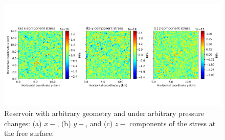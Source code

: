\documentclass[journal abbreviation, manuscript]{copernicus}
\begin{document}
\begin{figure}[ht]
\includegraphics[width=12cm]{Fig/Figure_Null_stress_complex_reservoir.png}
\caption{Reservoir with arbitrary geometry and under arbitrary pressure changes: (a) $x-$, (b) $y-$, and (c) $z-$ components of the stress at the free surface.}
\label{fig:Null_stress_complex_reservoir}
\end{figure}











\end{document}
